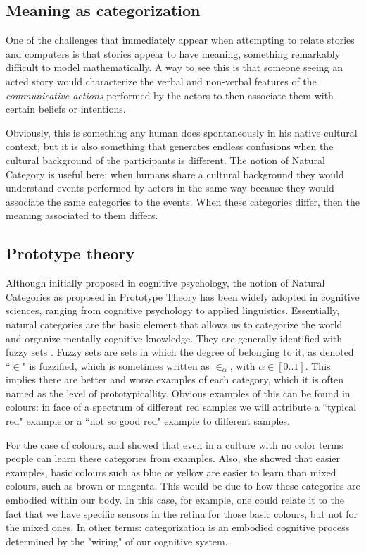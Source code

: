 \documentclass[
		twoside,openright,titlepage,numbers=noenddot,manychapters,
		headinclude,%
                footinclude=false,cleardoublepage=empty,
                BCOR=5mm,
		fontsize=11pt, %
                 enabledeprecatedfontcommands]{scrreprt}
\begin{document}
\subsection{Meaning as categorization}
One of the challenges that immediately appear when attempting to relate stories and computers is that stories  appear to have meaning, something remarkably difficult to model mathematically. A way to see this is that someone seeing an acted story would characterize the verbal and non-verbal features of the \emph{communicative actions} performed by the actors to then associate them with certain beliefs or intentions.

Obviously, this is something any human does spontaneously in his native cultural context, but it is also something that generates endless confusions when the cultural background of the participants is different. The notion of Natural Category \cite[]{Rosch1973} is useful here: when humans share a cultural background they would understand events performed by actors in the same way because they would associate the same categories to the events. When these categories differ, then the meaning associated to them differs.%



\subsection{Prototype theory}

 Although initially proposed in cognitive psychology, the notion of Natural Categories as proposed in Prototype Theory \cite[]{rosch1996frs} has been widely adopted in cognitive sciences, ranging from cognitive psychology to applied linguistics. Essentially, natural categories are the basic element that allows us to categorize the world and organize mentally cognitive knowledge. They are generally identified with fuzzy sets \cite[]{zadeh1996fs}. Fuzzy sets are sets in which the degree of belonging to it, as denoted  ``$\in$" is fuzzified, which is sometimes written as $\in_{\alpha}$, with $\alpha \in [0..1]$.
  This implies there are better and worse examples of each category, which it is often named as the level of prototypicallity. Obvious examples of this can be found in colours: in face of a spectrum of different red samples we will attribute a ``typical red" example or a ``not so good red" example to different samples. 

For the case of colours, \cite{rosch1996frs}  and \cite{rosch1978principles} showed that even in a culture with no color terms people can learn these categories from examples. Also, she showed that easier examples,  basic colours such as blue or yellow are easier to learn than mixed colours, such as brown or magenta. This would be due to how these categories are embodied within our body. In this case, for example, one could relate it to the fact that we have specific sensors in the retina for those basic colours, but not for the mixed ones. In other terms: categorization is an embodied cognitive process determined by the "wiring" of our cognitive system.
\end{document}
